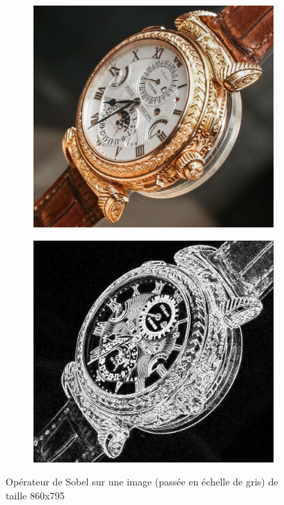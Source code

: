         \begin{figure}[!h]
            \centering
            \begin{subfigure}[b]{0.4\textwidth}
                \includegraphics[width=1\textwidth]{report_src/effects/org3.jpg}
            \end{subfigure}
            \begin{subfigure}[b]{0.4\textwidth}
                \includegraphics[width=1\textwidth]{report_src/effects/sobel3.jpg}
            \end{subfigure}
            \caption*{Opérateur de Sobel sur une image (passée en échelle de gris) de taille 860x795}
        \end{figure} 

